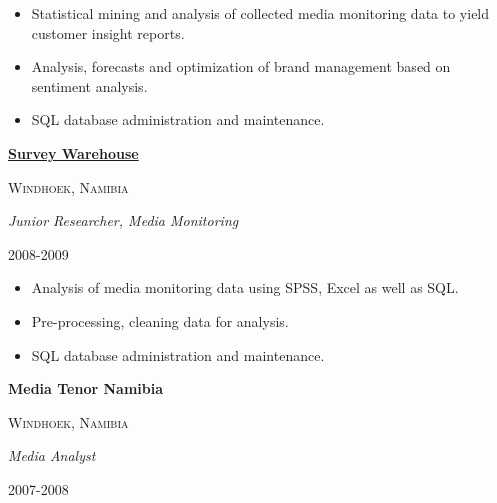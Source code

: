 \documentclass[
  letterpaper,
  DIV=11,
  numbers=noendperiod]{scrartcl}
\providecommand{\tightlist}{%
  \setlength{\itemsep}{0pt}\setlength{\parskip}{0pt}}\usepackage{longtable,booktabs,array}
\begin{document}
\begin{itemize}
\tightlist
\item
  Statistical mining and analysis of collected media monitoring data to
  yield customer insight reports.
\item
  Analysis, forecasts and optimization of brand management based on
  sentiment analysis.
\item
  SQL database administration and maintenance.
\end{itemize}

\vspace{5pt}

\begin{large}
  \begin{multicols}{2}
    \begin{flushleft}{\bf \href{https://surveywarehouse.com.na/}{Survey Warehouse}}\end{flushleft}
    \begin{flushright}\textsc{Windhoek, Namibia}\end{flushright}
  \end{multicols}
  \vspace{-0.17cm}
  \begin{multicols}{2}
    \begin{flushleft}\textit{Junior Researcher, Media Monitoring}\end{flushleft}
    \begin{flushright}2008-2009\end{flushright}
  \end{multicols}
\end{large}
\vspace{-0.16cm}

\begin{itemize}
\tightlist
\item
  Analysis of media monitoring data using SPSS, Excel as well as SQL.
\item
  Pre-processing, cleaning data for analysis.
\item
  SQL database administration and maintenance.
\end{itemize}

\vspace{5pt}

\begin{large}
  \begin{multicols}{2}
    \begin{flushleft}\textbf{Media Tenor Namibia}\end{flushleft}
    \begin{flushright}\textsc{Windhoek, Namibia}\end{flushright}
  \end{multicols}
  \vspace{-0.17cm}
  \begin{multicols}{2}
    \begin{flushleft}\textit{Media Analyst}\end{flushleft}
    \begin{flushright}2007-2008\end{flushright}
  \end{multicols}
\end{large}
\vspace{-0.16cm}
\end{document}
